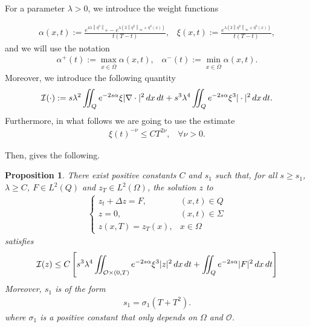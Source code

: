 \documentclass{amsart}    %
\newcommand{\norm}[2]{\left\|#1\right\|_{#2}}
\newcommand{\intd}{\displaystyle\int \kern -7pt \int}
\newtheorem{proposition}{\bf Proposition}[section]
\begin{document}
For a parameter $\lambda>0$, we introduce the weight functions

\begin{align}\label{weight}
	\alpha(x,t):=\frac{e^{4\lambda\norm{\eta^0}{\infty}}-e^{\lambda\left(2\norm{\eta^0}{\infty}+\eta^0(x)\right)}}{t(T-t)}, \;\;\; \xi(x,t):=\frac{e^{\lambda\left(2\norm{\eta^0}{\infty}+\eta^0(x)\right)}}{t(T-t)},
\end{align}
and we will use the notation 
\begin{align}\label{notation_alpha}
	\alpha^+(t):= \max_{x\in\overline{\Omega}}\alpha(x,t), \;\;\; \alpha^-(t):= \min_{x\in\overline{\Omega}}\alpha(x,t). 
\end{align}
Moreover, we introduce the following quantity 
\begin{align*}
	\mathcal I(\cdot):= s\lambda^2\intd_Q e^{-2s\alpha}\xi|\nabla \cdot|^2\,dx\,dt + s^3\lambda^4\intd_Q e^{-2s\alpha}\xi^3|\cdot|^2\,dx\,dt.
\end{align*}	
Furthermore, in what follows we are going to use the estimate
\begin{align}\label{xi_est}
	\xi(t)^{-\nu}\leq CT^{2\nu},\;\;\;\forall\nu>0.
\end{align}

Then, \cite[Lemma 1.3]{fernandez2006global} gives the following.

\begin{proposition}\label{carleman z_prop} 
There exist positive constants $C$ and $s_1$ such that, for all $s\geq s_1$, $\lambda\geq C$, $F\in L^2(Q)$ and $z_T\in L^2(\Omega)$, the solution $z$ to 
\begin{align}\label{syst_z}
	\begin{cases}
		z_t+\Delta z = F, & (x,t)\in Q
		\\
		z=0, & (x,t)\in\Sigma
		\\
		z(x,T) = z_T(x), & x\in \Omega
	\end{cases}
\end{align}
satisfies
\begin{align}\label{carleman z}
	\mathcal{I}(z) \leq C \left[s^3\lambda^4\intd_{\mathcal O\times(0,T)} e^{-2s\alpha}\xi^3 |z|^2\,dx\,dt + \intd_Q e^{-2s\alpha}|F|^2\,dx\,dt\right]
\end{align}
Moreover, $s_1$ is of the form 
\begin{align}\label{e6s2}
	s_1 = \sigma_1\left(T+T^2\right).
\end{align}
where $\sigma_1$ is a positive constant that only depends on $\Omega$ and $\mathcal O$.
\end{proposition}
\end{document}
